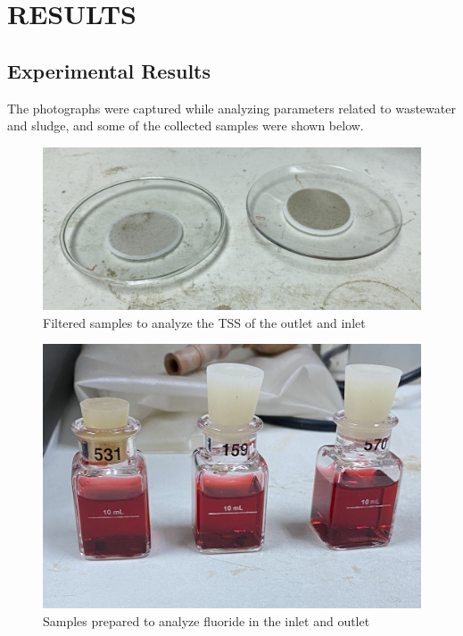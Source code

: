 \newpage
\section{RESULTS}

\subsection{Experimental Results}
The photographs were captured while analyzing parameters related to wastewater and sludge, and some of the collected samples were shown below.








\begin{figure}[H]
\centering
\includegraphics[width=0.77\linewidth]{results/tss_analyze_sample.JPG}
\caption{Filtered samples to analyze the \ac{TSS} of the outlet and inlet}
\label{fig:tss_analyze_sample}
\end{figure}


\begin{figure}[H]
\centering
\includegraphics[width=0.6\linewidth]{results/fluoride_analyze_sample.JPG}
\caption{Samples prepared to analyze fluoride in the inlet and outlet}
\label{fig:fluoride_analyze_sample}
\end{figure}



